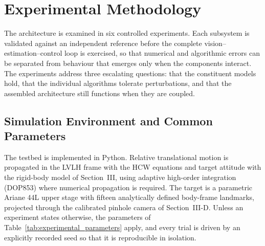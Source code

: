 \section{Experimental Methodology}
\label{sec:method}

The architecture is examined in six controlled experiments. Each subsystem is
validated against an independent reference before the complete
vision--estimation--control loop is exercised, so that numerical and
algorithmic errors can be separated from behaviour that emerges only when the
components interact. The experiments address three escalating questions: that
the constituent models hold, that the individual algorithms tolerate
perturbations, and that the assembled architecture still functions when they
are coupled.

\subsection{Simulation Environment and Common Parameters}

The testbed is implemented in Python. Relative translational motion is
propagated in the LVLH frame with the HCW equations and target attitude with
the rigid-body model of Section~III, using adaptive high-order integration
(DOP853) where numerical propagation is required. The target is a parametric
Ariane 44L upper stage with fifteen analytically defined body-frame landmarks,
projected through the calibrated pinhole camera of Section~III-D. Unless an
experiment states otherwise, the parameters of
Table~\ref{tab:experimental_parameters} apply, and every trial is driven by an
explicitly recorded seed so that it is reproducible in isolation.

